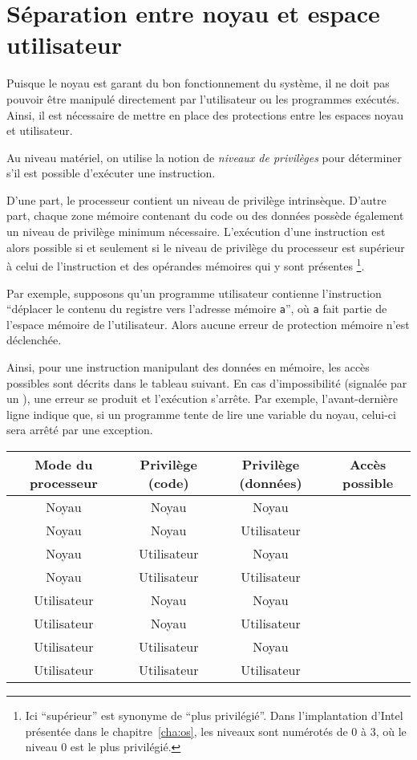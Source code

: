 \section{Séparation entre noyau et espace utilisateur}

Puisque le noyau est garant du bon fonctionnement du système, il ne doit pas
pouvoir être manipulé directement par l'utilisateur ou les programmes exécutés.
Ainsi, il est nécessaire de mettre en place des protections entre les espaces
noyau et utilisateur.

Au niveau matériel, on utilise la notion de \emph{niveaux de privilèges} pour
déterminer s'il est possible d'exécuter une instruction.

D'une part, le processeur contient un niveau de privilège intrinsèque. D'autre
part, \linebreak chaque zone mémoire contenant du code ou des données possède
également un niveau de privilège minimum nécessaire. L'exécution d'une
instruction est alors possible si et seulement si le niveau de privilège du
processeur est supérieur à celui de l'instruction et des opérandes mémoires qui
y sont présentes
\footnote{
  Ici \enquote{supérieur} est synonyme de \enquote{plus privilégié}. Dans l'implantation
  d'Intel présentée dans le chapitre~\ref{cha:os}, les niveaux sont numérotés de
  0 à 3, où le niveau 0 est le plus privilégié.
}.

Par exemple, supposons qu'un programme utilisateur contienne l'instruction
\enquote{déplacer le contenu du registre \eax{} vers l'adresse mémoire
\texttt{a}}, où \texttt{a} fait partie de l'espace mémoire de l'utilisateur.
Alors aucune erreur de protection mémoire n'est déclenchée.

Ainsi, pour une instruction manipulant des données en mémoire, les accès
possibles sont décrits dans le tableau suivant. En cas d'impossibilité (signalée
par un \Square), une erreur se produit et l'exécution s'arrête. Par exemple,
l'avant-dernière ligne indique que, si un programme tente de lire une variable du
noyau, celui-ci sera arrêté par une exception.

\begin{center}
\def\modeK{Noyau\xspace}
\def\modeU{Utilisateur\xspace}
\begin{tabular}{cccc}
\toprule
  Mode du processeur
& Privilège (code)
& Privilège (données)
& Accès possible \\
\midrule
  \modeK{} & \modeK{} & \modeK{} & \CheckedBox{} \\
  \modeK{} & \modeK{} & \modeU{} & \CheckedBox{} \\
  \modeK{} & \modeU{} & \modeK{} & \CheckedBox{} \\
  \modeK{} & \modeU{} & \modeU{} & \CheckedBox{} \\
  \modeU{} & \modeK{} & \modeK{} & \Square{} \\
  \modeU{} & \modeK{} & \modeU{} & \Square{} \\
  \modeU{} & \modeU{} & \modeK{} & \Square{} \\
  \modeU{} & \modeU{} & \modeU{} & \CheckedBox{} \\
\bottomrule
\end{tabular}
\end{center}
\label{page:erreursec}

